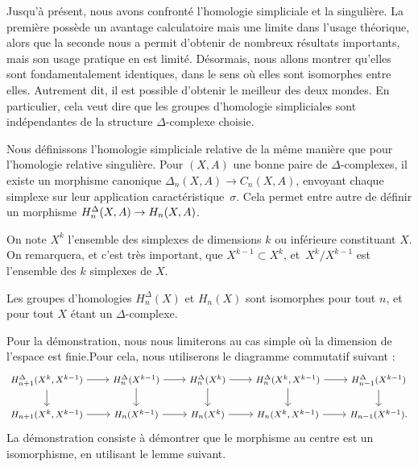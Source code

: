 Jusqu'à présent, nous avons confronté l'homologie simpliciale et la singulière. La première possède un avantage calculatoire mais une limite dans l'usage théorique, alors que la seconde nous a permit d'obtenir de nombreux résultats importants, mais son usage pratique en est limité. Désormais, nous allons montrer qu'elles sont fondamentalement identiques, dans le sens où elles sont isomorphes entre elles. Autrement dit, il est possible d'obtenir le meilleur des deux mondes. En particulier, cela veut dire que les groupes d'homologie simpliciales sont indépendantes de la structure $\Delta$-complexe choisie.

\bigskip Nous définissons l'homologie simpliciale relative de la même manière que pour l'homologie relative singulière. Pour $(X,A)$ une bonne paire de $\Delta$-complexes, il existe un morphisme canonique $\Delta_n(X,A)\to C_n(X,A)$, envoyant chaque simplexe sur leur application caractéristique~$\sigma$. Cela permet entre autre de définir un morphisme $H^\Delta_n(X,A)\to H_n(X,A)$. 

On note $X^k$ l'ensemble des simplexes de dimensions $k$ ou inférieure constituant $X$. On remarquera, et c'est très important, que $X^{k-1}\subset X^k$, et~$X^k/X^{k-1}$ est l'ensemble des $k$ simplexes de $X$.

\begin{theorem}
Les groupes d'homologies $H_n^\Delta(X)$ et $H_n(X)$ sont isomorphes pour tout $n$, et pour tout $X$ étant un $\Delta$-complexe.
\end{theorem}

Pour la démonstration, nous nous limiterons au cas simple où la dimension de l'espace est finie.Pour cela, nous utiliserons le diagramme commutatif suivant : \[\footnotesize\begin{tikzcd}
H_{n+1}^\Delta(X^k,X^{k-1})\arrow[d]\arrow[r]&H_{n}^\Delta(X^{k-1})\arrow[d]\arrow[r]&H_{n}^\Delta(X^{k})\arrow[d]\arrow[r]&H_{n}^\Delta(X^k,X^{k-1})\arrow[d]\arrow[r]&H_{n-1}^\Delta(X^{k-1})\arrow[d]\\
H_{n+1}(X^k,X^{k-1})\arrow[r]&H_{n}(X^{k-1})\arrow[r]&H_{n}(X^{k})\arrow[r]&H_{n}(X^k,X^{k-1})\arrow[r]&H_{n-1}(X^{k-1}).
\end{tikzcd}\] La démonstration consiste à démontrer que le morphisme au centre est un isomorphisme, en utilisant le lemme suivant.

